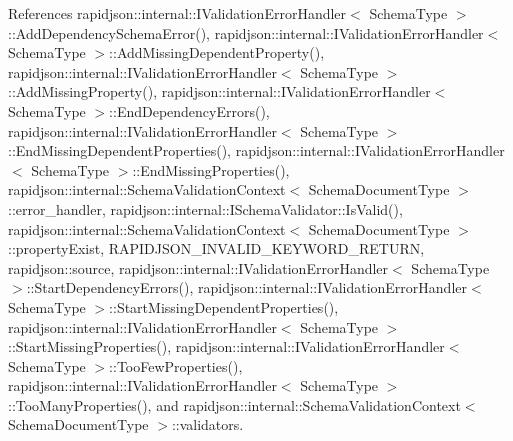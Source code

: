 \begin{DoxyCode}{0}

\end{DoxyCode}


References rapidjson\+::internal\+::\+I\+Validation\+Error\+Handler$<$ Schema\+Type $>$\+::\+Add\+Dependency\+Schema\+Error(), rapidjson\+::internal\+::\+I\+Validation\+Error\+Handler$<$ Schema\+Type $>$\+::\+Add\+Missing\+Dependent\+Property(), rapidjson\+::internal\+::\+I\+Validation\+Error\+Handler$<$ Schema\+Type $>$\+::\+Add\+Missing\+Property(), rapidjson\+::internal\+::\+I\+Validation\+Error\+Handler$<$ Schema\+Type $>$\+::\+End\+Dependency\+Errors(), rapidjson\+::internal\+::\+I\+Validation\+Error\+Handler$<$ Schema\+Type $>$\+::\+End\+Missing\+Dependent\+Properties(), rapidjson\+::internal\+::\+I\+Validation\+Error\+Handler$<$ Schema\+Type $>$\+::\+End\+Missing\+Properties(), rapidjson\+::internal\+::\+Schema\+Validation\+Context$<$ Schema\+Document\+Type $>$\+::error\+\_\+handler, rapidjson\+::internal\+::\+I\+Schema\+Validator\+::\+Is\+Valid(), rapidjson\+::internal\+::\+Schema\+Validation\+Context$<$ Schema\+Document\+Type $>$\+::property\+Exist, R\+A\+P\+I\+D\+J\+S\+O\+N\+\_\+\+I\+N\+V\+A\+L\+I\+D\+\_\+\+K\+E\+Y\+W\+O\+R\+D\+\_\+\+R\+E\+T\+U\+RN, rapidjson\+::source, rapidjson\+::internal\+::\+I\+Validation\+Error\+Handler$<$ Schema\+Type $>$\+::\+Start\+Dependency\+Errors(), rapidjson\+::internal\+::\+I\+Validation\+Error\+Handler$<$ Schema\+Type $>$\+::\+Start\+Missing\+Dependent\+Properties(), rapidjson\+::internal\+::\+I\+Validation\+Error\+Handler$<$ Schema\+Type $>$\+::\+Start\+Missing\+Properties(), rapidjson\+::internal\+::\+I\+Validation\+Error\+Handler$<$ Schema\+Type $>$\+::\+Too\+Few\+Properties(), rapidjson\+::internal\+::\+I\+Validation\+Error\+Handler$<$ Schema\+Type $>$\+::\+Too\+Many\+Properties(), and rapidjson\+::internal\+::\+Schema\+Validation\+Context$<$ Schema\+Document\+Type $>$\+::validators.

